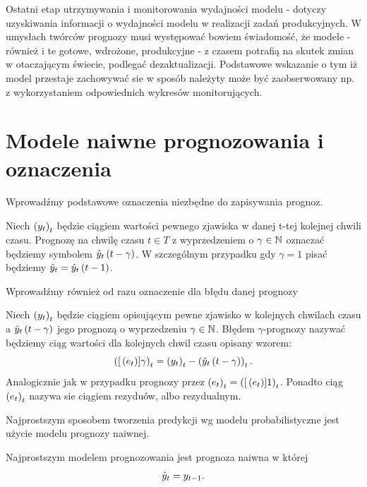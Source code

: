 \documentclass[10pt,a4paper]{book}
\begin{document}
Ostatni etap utrzymywania i monitorowania wydajności modelu - dotyczy uzyskiwania informacji o wydajności modelu w realizacji zadań produkcyjnych. W umysłach twórców prognozy musi występować bowiem świadomość, że modele  -również i te gotowe, wdrożone, produkcyjne - z czasem potrafią na skutek zmian w otaczającym świecie, podlegać dezaktualizacji. Podstawowe wskazanie o tym iż model przestaje zachowywać sie w sposób należyty może być zaobserwowany np. z wykorzystaniem odpowiednich wykresów monitorujących.

\section{Modele naiwne prognozowania i oznaczenia}

Wprowadźmy podstawowe oznaczenia niezbędne do zapisywania prognoz.

\begin{definition}
Niech $\left( {y_t} \right)_{t}^{} $ będzie ciągiem wartości pewnego zjawiska w danej t-tej kolejnej chwili czasu. Prognozę na chwilę czasu $t \in T$ z wyprzedzeniem o $\gamma \in \mathbb{N}$ oznaczać będziemy symbolem $\predict[t-\gamma]{y}{t}$. W szczególnym przypadku gdy $\gamma =1$ pisać będziemy $\predict{y}{t}= \predict[t-1]{y}{t}$.
\end{definition}

Wprowadźmy również od razu oznaczenie dla błędu danej prognozy

\begin{definition}
Niech $\left( {y_t} \right)_{t}^{} $ będzie ciągiem opisującym pewne zjawisko w kolejnych chwilach czasu a $\predict[t-\gamma]{y}{t}$ jego prognozą o wyprzedzeniu $\gamma \in \mathbb{N}$. Błędem $\gamma$-prognozy nazywać będziemy ciąg wartości dla kolejnych chwil czasu opisany wzorem:
$$
\sequence{\function[{e_t}]{\gamma}}{t}{} = \sequence{y_t}{t}{} - \sequence{\predict[t-\gamma]{y}{t}}{t}{}.
$$
Analogicznie jak w przypadku prognozy przez $\left( {e_t} \right)_{t}^{} = \left( {{{[}\left( {e_t} \right)}]{1} } \right)_{t}^{} $. Ponadto ciąg $\left( {e_t} \right)_{t}^{} $ nazywa sie ciągiem rezyduów, albo rezydualnym.
\end{definition}

Najprostszym sposobem tworzenia predykcji wg modelu probabilistyczne jest użycie modelu prognozy naiwnej.

\begin{definition}
Najprostszym modelem prognozowania jest prognoza naiwna w której
$$
\predict{y}{t} = y_{t-1}.
$$
\end{definition}
\end{document}
